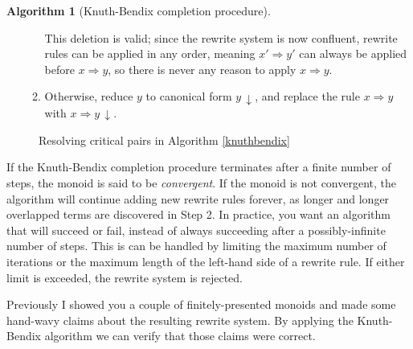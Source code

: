 \documentclass[headsepline,bibliography=totoc]{scrreport}
\theoremstyle{definition}
\theoremstyle{definition}
\theoremstyle{definition}
\newtheorem{algorithm}{Algorithm}[chapter]
\begin{document}
\begin{algorithm}[Knuth-Bendix completion procedure]
\begin{enumerate}
\begin{enumerate}
This deletion is valid; since the rewrite system is now confluent, rewrite rules can be applied in any order, meaning $x'\Rightarrow y'$ can always be applied before $x\Rightarrow y$, so there is never any reason to apply $x\Rightarrow y$. 
\item Otherwise, reduce $y$ to canonical form ${y}\,{\downarrow}$, and replace the rule $x\Rightarrow y$ with $x\Rightarrow {y}\,{\downarrow}$.
\end{enumerate}
\end{enumerate}
\end{algorithm}
\begin{figure}\caption{Resolving critical pairs in Algorithm \ref{knuthbendix}}\label{criticalfig}
\begin{center}
\end{center}
\end{figure}
If the Knuth-Bendix completion procedure terminates after a finite number of steps, the monoid is said to be \emph{convergent}. If the monoid is not convergent, the algorithm will continue adding new rewrite rules forever, as longer and longer overlapped terms are discovered in Step 2. In practice, you want an algorithm that will succeed or fail, instead of always succeeding after a possibly-infinite number of steps. This is can be handled by limiting the maximum number of iterations or the maximum length of the left-hand side of a rewrite rule. If either limit is exceeded, the rewrite system is rejected.

Previously I showed you a couple of finitely-presented monoids and made some hand-wavy claims about the resulting rewrite system. By applying the Knuth-Bendix algorithm we can verify that those claims were correct.
\end{document}
